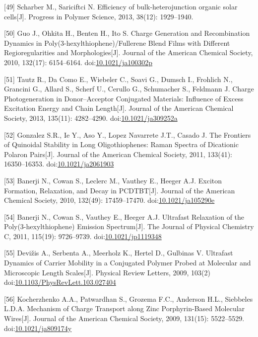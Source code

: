 \documentclass[12pt,]{report}
\begin{document}
{[}49{]} Scharber M., Sariciftci N. Efficiency of bulk-heterojunction
organic solar cells{[}J{]}. Progress in Polymer Science, 2013, 38(12):
1929--1940. 

{[}50{]} Guo J., Ohkita H., Benten H., Ito S. Charge Generation and
Recombination Dynamics in Poly(3-hexylthiophene)/Fullerene Blend Films
with Different Regioregularities and Morphologies{[}J{]}. Journal of the
American Chemical Society, 2010, 132(17): 6154--6164.
doi:\href{http://dx.doi.org/10.1021/ja100302p}{10.1021/ja100302p}

{[}51{]} Tautz R., Da Como E., Wiebeler C., Soavi G., Dumsch I.,
Frohlich N., Grancini G., Allard S., Scherf U., Cerullo G., Schumacher
S., Feldmann J. Charge Photogeneration in Donor--Acceptor Conjugated
Materials: Influence of Excess Excitation Energy and Chain
Length{[}J{]}. Journal of the American Chemical Society, 2013, 135(11):
4282--4290.
doi:\href{http://dx.doi.org/10.1021/ja309252a}{10.1021/ja309252a}

{[}52{]} Gonzalez S.R., Ie Y., Aso Y., Lopez Navarrete J.T., Casado J.
The Frontiers of Quinoidal Stability in Long Oligothiophenes: Raman
Spectra of Dicationic Polaron Pairs{[}J{]}. Journal of the American
Chemical Society, 2011, 133(41): 16350--16353.
doi:\href{http://dx.doi.org/10.1021/ja2061903}{10.1021/ja2061903}

{[}53{]} Banerji N., Cowan S., Leclerc M., Vauthey E., Heeger A.J.
Exciton Formation, Relaxation, and Decay in PCDTBT{[}J{]}. Journal of
the American Chemical Society, 2010, 132(49): 17459--17470.
doi:\href{http://dx.doi.org/10.1021/ja105290e}{10.1021/ja105290e}

{[}54{]} Banerji N., Cowan S., Vauthey E., Heeger A.J. Ultrafast
Relaxation of the Poly(3-hexylthiophene) Emission Spectrum{[}J{]}. The
Journal of Physical Chemistry C, 2011, 115(19): 9726--9739.
doi:\href{http://dx.doi.org/10.1021/jp1119348}{10.1021/jp1119348}

{[}55{]} Devižis A., Serbenta A., Meerholz K., Hertel D., Gulbinas V.
Ultrafast Dynamics of Carrier Mobility in a Conjugated Polymer Probed at
Molecular and Microscopic Length Scales{[}J{]}. Physical Review Letters,
2009, 103(2)
doi:\href{http://dx.doi.org/10.1103/PhysRevLett.103.027404}{10.1103/PhysRevLett.103.027404}

{[}56{]} Kocherzhenko A.A., Patwardhan S., Grozema F.C., Anderson H.L.,
Siebbeles L.D.A. Mechanism of Charge Transport along Zinc
Porphyrin-Based Molecular Wires{[}J{]}. Journal of the American Chemical
Society, 2009, 131(15): 5522--5529.
doi:\href{http://dx.doi.org/10.1021/ja809174y}{10.1021/ja809174y}
\end{document}
